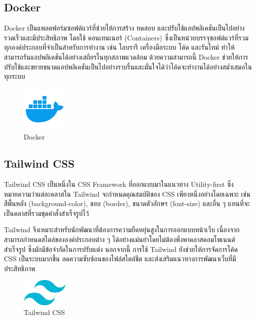 \subsection{Docker}
Docker เป็นแพลตฟอร์มซอฟต์แวร์ที่ช่วยให้การสร้าง ทดสอบ และปรับใช้แอปพลิเคชันเป็นไปอย่างรวดเร็วและมีประสิทธิภาพ โดยใช้ คอนเทนเนอร์ (Containers) ซึ่งเป็นหน่วยบรรจุซอฟต์แวร์ที่รวมทุกองค์ประกอบที่จำเป็นสำหรับการทำงาน เช่น ไลบรารี เครื่องมือระบบ โค้ด และรันไทม์ ทำให้สามารถรันแอปพลิเคชันได้อย่างเสถียรในทุกสภาพแวดล้อม ด้วยความสามารถนี้ Docker ช่วยให้การปรับใช้และขยายขนาดแอปพลิเคชันเป็นไปอย่างราบรื่นและมั่นใจได้ว่าโค้ดจะทำงานได้อย่างสม่ำเสมอในทุกระบบ \cite{aiw7}
\begin{figure}[H]
  \begin{center}
  \includegraphics[width=0.2\textwidth]{4373190_docker_logo_logos_icon.png}
  \end{center}
  \caption[Docker]{Docker}
\end{figure}
\subsection{Tailwind CSS}
Tailwind CSS เป็นหนึ่งใน CSS Framework ที่ออกแบบมาในแนวทาง Utility-first ซึ่งหมายความว่าแต่ละคลาสใน Tailwind จะกำหนดคุณสมบัติของ CSS เพียงหนึ่งอย่างโดยเฉพาะ เช่น สีพื้นหลัง (background-color), ขอบ (border), ขนาดตัวอักษร (font-size) และอื่น ๆ แทนที่จะเป็นคลาสที่รวมชุดคำสั่งสำเร็จรูปไว้

Tailwind จึงเหมาะสำหรับนักพัฒนาที่ต้องการความยืดหยุ่นสูงในการออกแบบหน้าเว็บ เนื่องจากสามารถกำหนดสไตล์ขององค์ประกอบต่าง ๆ ได้อย่างแม่นยำโดยไม่ต้องพึ่งพาคลาสคอมโพเนนต์สำเร็จรูป ซึ่งมักมีข้อจำกัดในการปรับแต่ง นอกจากนี้ การใช้ Tailwind ยังช่วยให้การจัดการโค้ด CSS เป็นระบบมากขึ้น ลดความซับซ้อนของไฟล์สไตล์ชีต และส่งเสริมแนวทางการพัฒนาเว็บที่มีประสิทธิภาพ \cite{aiw8}
\begin{figure}[H]
  \begin{center}
  \includegraphics[width=0.2\textwidth]{pngwing.com (4).png}
  \end{center}
  \caption[Tailwind CSS]{Tailwind CSS}
\end{figure}

